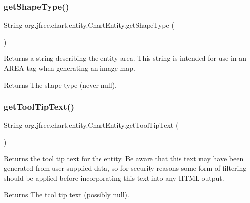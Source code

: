 \subsubsection{\texorpdfstring{get\+Shape\+Type()}{getShapeType()}}
{\footnotesize\ttfamily String org.\+jfree.\+chart.\+entity.\+Chart\+Entity.\+get\+Shape\+Type (\begin{DoxyParamCaption}{ }\end{DoxyParamCaption})}

Returns a string describing the entity area. This string is intended for use in an A\+R\+EA tag when generating an image map.

\begin{DoxyReturn}{Returns}
The shape type (never {\ttfamily null}). 
\end{DoxyReturn}
\mbox{\label{classorg_1_1jfree_1_1chart_1_1entity_1_1_chart_entity_a5a9a6d9b933a9737a871f7c7d1b01d01}} 
\subsubsection{\texorpdfstring{get\+Tool\+Tip\+Text()}{getToolTipText()}}
{\footnotesize\ttfamily String org.\+jfree.\+chart.\+entity.\+Chart\+Entity.\+get\+Tool\+Tip\+Text (\begin{DoxyParamCaption}{ }\end{DoxyParamCaption})}

Returns the tool tip text for the entity. Be aware that this text may have been generated from user supplied data, so for security reasons some form of filtering should be applied before incorporating this text into any H\+T\+ML output.

\begin{DoxyReturn}{Returns}
The tool tip text (possibly {\ttfamily null}). 
\end{DoxyReturn}
\mbox{\label{classorg_1_1jfree_1_1chart_1_1entity_1_1_chart_entity_ad83d3939acf913cd90c2663ec1486beb}} 

